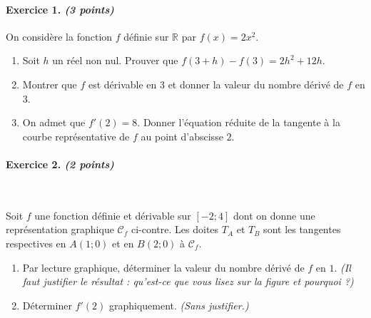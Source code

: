 \documentclass[11pt]{article}
\newcommand{\Cf}{\mathscr C_f}
\begin{document}

\paragraph{Exercice 1. \emph{(3 points)}} On considère la fonction $f$ définie sur $\mathbb{R}$
par $f(x)=2x^2$.
\begin{enumerate}
  \item Soit $h$ un réel non nul. Prouver que $f(3+h)-f(3)=2h^2+12h$.
  \item Montrer que $f$ est dérivable en $3$ et donner la valeur du nombre
    dérivé de $f$ en $3$.
  \item On admet que $f'(2)=8$. Donner l'équation réduite de la tangente à la courbe
    représentative de $f$ au point d'abscisse $2$.
\end{enumerate}

\paragraph{Exercice 2. \emph{(2 points)}}~\\
\begin{minipage}{.5\textwidth}
  Soit $f$ une fonction définie et dérivable sur $[-2;4]$ dont on donne une
  représentation graphique $\Cf$ ci-contre. Les doites $T_A$ et $T_B$ sont les
  tangentes respectives en $A(1; 0)$ et en $B(2;0)$ à $\Cf$.
  \begin{enumerate}
    \item Par lecture graphique, déterminer la valeur du nombre dérivé de $f$ en
      $1$. \emph{(Il faut justifier le résultat : qu'est-ce que vous lisez sur
      la figure et pourquoi ?)}
    \item Déterminer $f'(2)$ graphiquement. \emph{(Sans justifier.)}
  \end{enumerate}
\end{minipage}
\begin{minipage}{.5\textwidth}
\begin{center}
\end{center}
\end{minipage}
\end{document}
